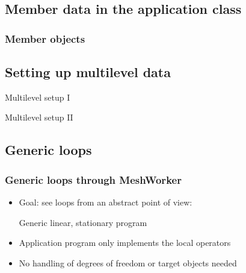 \subsection{Member data in the application class}
\begin{frame}
  \frametitle{Member objects}
  \begin{block}{}
    
  \end{block}
\end{frame}

\subsection{Setting up multilevel data}
\begin{frame}
  \begin{block}{Multilevel setup I}
    
  \end{block}
\end{frame}

\begin{frame}
  \begin{block}{Multilevel setup II}
    
  \end{block}
\end{frame}

\subsection{Generic loops}

\begin{frame}
  \frametitle{Generic loops through MeshWorker}
  \begin{itemize}
  \item Goal: see loops from an abstract point of view:
      \begin{block}{Generic linear, stationary program}
    
  \end{block}  
  \item Application program only implements the local operators
    \item No handling of degrees of freedom or target objects needed
  \end{itemize}
\end{frame}

